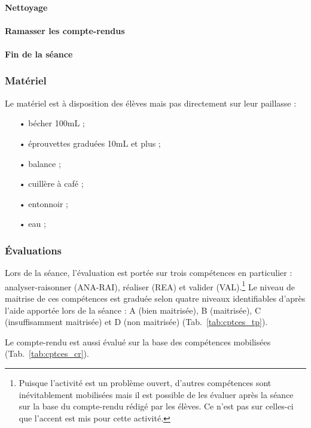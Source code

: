 \documentclass[12pt,a4paper]{article}
\newcommand{\rea}{\colorbox{yellow_c}{\textcolor{yellow_f}{REA}}}
\newcommand{\anarai}{\colorbox{green_c}{\textcolor{green_f}{ANA-RAI}}}
\newcommand{\val}{\colorbox{orange_c}{\textcolor{orange_f}{VAL}}}
\begin{document}
\paragraph{Nettoyage}

\paragraph{Ramasser les compte-rendus}
 
\paragraph{Fin de la séance}

\subsubsection{Matériel}

Le matériel est à disposition des élèves mais pas directement sur leur paillasse :
\begin{itemize}
\item[•] bécher \unit{100}{mL} ;
\item[•] éprouvettes graduées \unit{10}{mL} et plus ;
\item[•] balance ;
\item[•] cuillère à café ;
\item[•] entonnoir ;
\item[•] eau ;
\end{itemize}

\subsubsection{Évaluations}

Lors de la séance, l'évaluation est portée sur trois compétences en particulier : analyser-raisonner (\anarai{}), réaliser (\rea{}) et valider (\val{}).\footnote{Puisque l'activité est un problème ouvert, d'autres compétences sont inévitablement mobilisées mais il est possible de les évaluer après la séance sur la base du compte-rendu rédigé par les élèves.
Ce n'est pas sur celles-ci que l'accent est mis pour cette activité.}
Le niveau de maitrise de ces compétences est graduée selon quatre niveaux identifiables d'après l'aide apportée lors de la séance : A (bien maitrisée), B (maitrisée), C (insuffisamment maitrisée) et D (non maitrisée) (Tab.~\ref{tab:cptces_tp}).

Le compte-rendu est aussi évalué sur la base des compétences mobilisées (Tab.~\ref{tab:cptces_cr}).
\end{document}

